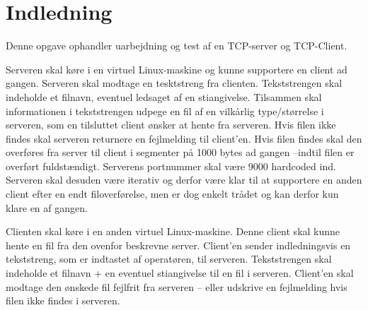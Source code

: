 \chapter{Indledning}\label{ch:introduction}
Denne opgave ophandler uarbejdning og test af en TCP-server og TCP-Client. 

Serveren skal køre i en virtuel Linux-maskine og kunne supportere en client ad gangen. Serveren skal modtage en tesktstreng fra clienten. Tekststrengen skal indeholde et filnavn, eventuel ledsaget af en stiangivelse. Tilsammen skal informationen i tekststrengen udpege en fil af en vilkårlig type/størrelse i serveren, som en tilsluttet client ønsker at hente fra serveren. Hvis filen ikke findes skal serveren returnere en fejlmelding til client’en. Hvis filen findes skal den overføres fra server til client i segmenter på 1000 bytes ad gangen –indtil filen er overført fuldstændigt. Serverens portnummer skal være 9000 hardcoded ind. 
Serveren skal desuden være iterativ og derfor være klar til at supportere en anden client efter en endt filoverførelse, men er dog enkelt trådet og kan derfor kun klare en af gangen.

Clienten skal køre i en anden virtuel Linux-maskine. Denne client skal kunne hente en fil fra den ovenfor beskrevne server. Client’en sender indledningsvis en tekststreng, som er indtastet af operatøren, til serveren. Tekststrengen skal indeholde et filnavn + en eventuel stiangivelse til en fil i serveren. Client’en skal modtage den ønskede fil fejlfrit fra serveren – eller udskrive en fejlmelding hvis filen ikke findes i serveren.